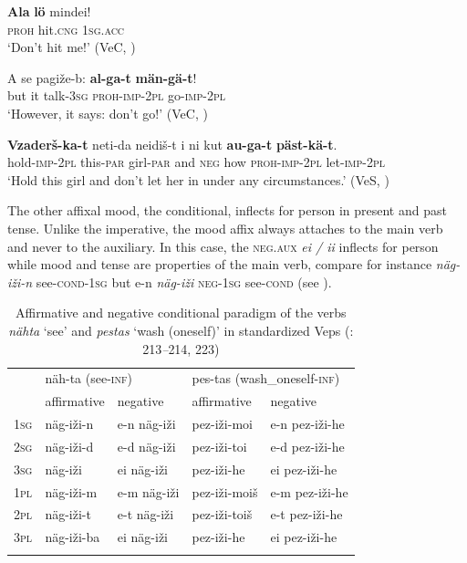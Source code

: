 \documentclass[output=paper,colorlinks=true, citecolor=brown]{langscibook}
\begin{document}
\ea
    \label{ex:vep:19}
    \gll \textbf{Ala}  \textbf{lö} mindei! \\
         \textsc{proh}  hit.\textsc{cng} \textsc{1sg.acc}\\
    \glt ‘Don’t hit me!’ (VeC, \citealt[40]{MSFOu70})
\z

\ea
    \label{ex:vep:20}
    \gll A se pagiže{}-b: \textbf{al{}-ga{}-t}  \textbf{män{}-gä{}-t}!\\
         but it talk-\textsc{3sg} \textsc{proh-imp-2pl} go-\textsc{imp-2pl}\\
    \glt ‘However, it says: don’t go!’ (VeC, \citealt[20]{MSFOu70})
\z

\ea
    \label{ex:vep:21}
    \gll \textbf{Vzaderš{}-ka{}-t} neti{}-da neidiš{}-t i ni kut \textbf{au{}-ga{}-t} \textbf{päst{}-kä{}-t}. \\
         hold-\textsc{imp}{}-2\textsc{pl} this-\textsc{par} girl-\textsc{par} and \textsc{neg} how \textsc{proh}{}-\textsc{imp}{}-2\textsc{pl} let-\textsc{imp}{}-2\textsc{pl}\\
    \glt ‘Hold this girl and don’t let her in under any circumstances.’ (VeS, \citealt[24]{Kettunen1925})
\z 
         
The other affixal mood, the conditional, inflects for person in present and past tense. Unlike the imperative, the mood affix always attaches to the main verb and never to the auxiliary. In this case, the \textsc{neg}.\textsc{aux} \textit{ei / ii} inflects for person while mood and tense are properties of the main verb, compare for instance \textit{näg-iži-n} see\textsc{{}-cond}{}-\textsc{1sg} but e-n \textit{näg-iži} \textsc{neg-1sg} see\textsc{{}-cond} (see ).

\begin{table}
\centering
\begin{tabularx}{\textwidth}{X lX ll}
\lsptoprule
& \multicolumn{2}{l}{näh{}-ta (see\textsc{-inf})} & \multicolumn{2}{l}{pes-tas (wash\_oneself\textsc{{}-inf})}\\
& {affirmative}  & {negative} & {affirmative}  & {negative}\\
\midrule 
\textsc{1sg} & näg-iži-n & e-n näg-iži & pez-iži-moi & e-n pez-iži-he \\
\textsc{2sg} & näg-iži-d & e-d näg-iži & pez-iži-toi & e-d pez-iži{}-he \\
\textsc{3sg} & näg-iži   & ei näg-iži & pez-iži-he & ei pez-iži{}-he \\
\textsc{1pl} & näg-iži{}-m & e-m näg-iži & pez-iži{}-moiš & e-m pez-iži{}-he \\
\textsc{2pl} & näg-iži{}-t & e-t näg-iži & pez-iži{}-toiš & e-t pez-iži{}-he \\
\textsc{3pl} & näg-iži{}-ba & ei näg-iži & pez-iži{}-he & ei pez-iži{}-he \\
\lspbottomrule
\end{tabularx}
    \caption{Affirmative and negative conditional paradigm of the verbs \textit{nähta} ‘see’ and \textit{pestas} ‘wash (oneself)’ in standardized Veps (\citealt{Zaitseva2000}: 213\textit{–}214, 223)}
    \label{tab:vep:4}
\end{table}
\end{document}
